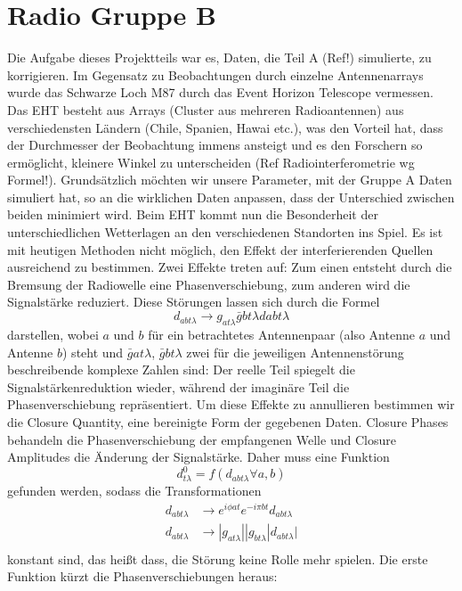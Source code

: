 \documentclass[]{dsadokumentation}
\begin{document}
\section{Radio Gruppe B}
Die Aufgabe dieses Projektteils war es, Daten, die Teil A (Ref!) simulierte, zu korrigieren. Im Gegensatz zu Beobachtungen durch einzelne Antennenarrays wurde das Schwarze Loch M87 durch das Event Horizon Telescope vermessen. Das EHT besteht aus Arrays (Cluster aus mehreren Radioantennen) aus verschiedensten Ländern (Chile, Spanien, Hawai etc.), was den Vorteil hat, dass der Durchmesser der Beobachtung immens ansteigt und es den Forschern so ermöglicht, kleinere Winkel zu unterscheiden (Ref Radiointerferometrie wg Formel!).
Grundsätzlich möchten wir unsere Parameter, mit der Gruppe A Daten simuliert hat, so an die wirklichen Daten anpassen, dass der Unterschied zwischen beiden minimiert wird. Beim EHT kommt nun die Besonderheit der unterschiedlichen Wetterlagen an den verschiedenen Standorten ins Spiel.
Es ist mit heutigen Methoden nicht möglich, den Effekt der interferierenden Quellen ausreichend zu bestimmen. Zwei Effekte treten auf: Zum einen entsteht durch die Bremsung der Radiowelle eine Phasenverschiebung, zum anderen wird die Signalstärke reduziert.
Diese Störungen lassen sich durch die Formel
$$d_{abt\lambda}\rightarrow g_{at\lambda} \bar{g}{bt\lambda}d{abt\lambda} $$
darstellen, wobei $a$ und $b$ für ein betrachtetes Antennenpaar (also Antenne $a$ und Antenne $b$) steht und $\bar{g}{at\lambda}$,  $\bar{g}{bt\lambda}$ zwei für die jeweiligen Antennenstörung beschreibende komplexe Zahlen sind: Der reelle Teil spiegelt die Signalstärkenreduktion wieder, während der imaginäre Teil die Phasenverschiebung repräsentiert.
Um diese Effekte zu annullieren bestimmen wir die Closure Quantity, eine bereinigte Form der gegebenen Daten. Closure Phases behandeln die Phasenverschiebung der empfangenen Welle und Closure Amplitudes die Änderung der Signalstärke. Daher muss eine Funktion $$d^0_{t\lambda}=f(d_{abt\lambda}\forall a,b)$$ gefunden werden, sodass die Transformationen
\begin{align*}
d_{abt\lambda} &\rightarrow e^{i \phi at} e^{-i\pi bt} d_{abt\lambda } \\
d_{abt\lambda}&\rightarrow|g_{at\lambda}||g_{bt\lambda}|d_{abt\lambda}|\\
\end{align*}
konstant sind, das heißt dass, die Störung keine Rolle mehr spielen.
Die erste Funktion kürzt die Phasenverschiebungen heraus:
\end{document}
